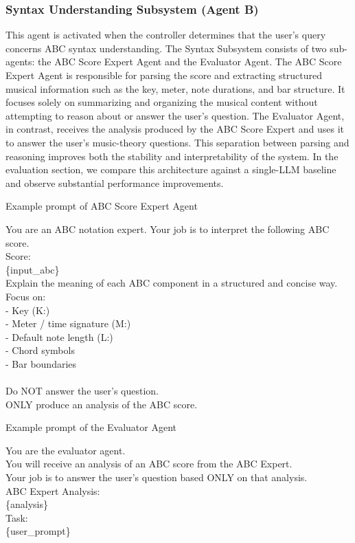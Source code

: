\documentclass[sigconf]{acmart}
\begin{document}
\subsubsection{Syntax Understanding Subsystem (Agent B)}
This agent is activated when the controller determines that the user’s query concerns ABC syntax understanding. The Syntax Subsystem consists of two sub-agents: the ABC Score Expert Agent and the Evaluator Agent. The ABC Score Expert Agent is responsible for parsing the score and extracting structured musical information such as the key, meter, note durations, and bar structure. It focuses solely on summarizing and organizing the musical content without attempting to reason about or answer the user’s question.
The Evaluator Agent, in contrast, receives the analysis produced by the ABC Score Expert and uses it to answer the user’s music-theory questions. This separation between parsing and reasoning improves both the stability and interpretability of the system. In the evaluation section, we compare this architecture against a single-LLM baseline and observe substantial performance improvements.

\begin{promptbox}{Example prompt of ABC Score Expert Agent}


You are an ABC notation expert. Your job is to interpret the following ABC score.\\

Score:\\
\{input\_abc\}\\

Explain the meaning of each ABC component in a structured and concise way.\\
Focus on:\\
- Key (K:)\\
- Meter / time signature (M:)\\
- Default note length (L:)\\
- Chord symbols\\
- Bar boundaries\\
\\
Do NOT answer the user's question.\\
ONLY produce an analysis of the ABC score.\\
\end{promptbox}
\begin{promptbox}{Example prompt of the Evaluator Agent}

You are the evaluator agent.\\

You will receive an analysis of an ABC score from the ABC Expert.\\
Your job is to answer the user's question based ONLY on that analysis.\\

ABC Expert Analysis:\\
\{analysis\}\\

Task:\\
\{user\_prompt\}\\

\end{promptbox}
\end{document}
